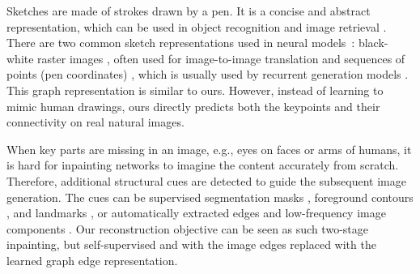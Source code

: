 \documentclass{article}
\begin{document}
\noindent{} Sketches are made of strokes drawn by a pen. It is a concise and abstract representation, which can be used in object recognition \cite{Yu2015SketchaNetTB, xu2021multigraph} and image retrieval \cite{wang2015sketch, qian2016sketch, xu2018sketchmate}. There are two common sketch representations used in neural models~\cite{Xu2022DeepLF}:
black-white raster images \cite{wang2019learning, SasakiCGI2018learning,  YiLLR19APDrawingGAN}, often used for image-to-image translation \cite{isola2017image, zhu2017unpaired, pang2018deep, kampelmuhler2020synthesizing}
and sequences of points (pen coordinates) \cite{ha2018a, eitz2012hdhso, sangkloy2016the}, which is usually used by recurrent generation models \cite{ha2018a, chen2017sketch, Cao2019ai, kaiyrbekov2019deep, das2020beziersketch, ge2021creative}. This graph representation is similar to ours. However, instead of learning to mimic human drawings, ours directly predicts both the keypoints and their connectivity on real natural images.

\noindent{} When key parts are missing in an image, e.g., eyes on faces or arms of humans, it is hard for inpainting networks to imagine the content accurately from scratch.
Therefore, additional structural cues are detected to guide the subsequent image generation. 
The cues can be supervised segmentation masks \cite{zhao2021prior, liao2020guidance, han2019finet, song2018spg}, foreground contours \cite{xiong2019foreground}, and landmarks \cite{lahiri2020prior, zhang2021face, yang2020generative}, or automatically extracted
 edges \cite{nazeri2019edgeconnect, li2019progressive, jie2020inpainting, xu2020anedge, cao2021learning} and low-frequency image components \cite{wang2020image, ren2019structureflow}. 
Our reconstruction objective can be seen as such two-stage inpainting, but self-supervised and with the image edges replaced with the learned graph edge representation. 
\end{document}
